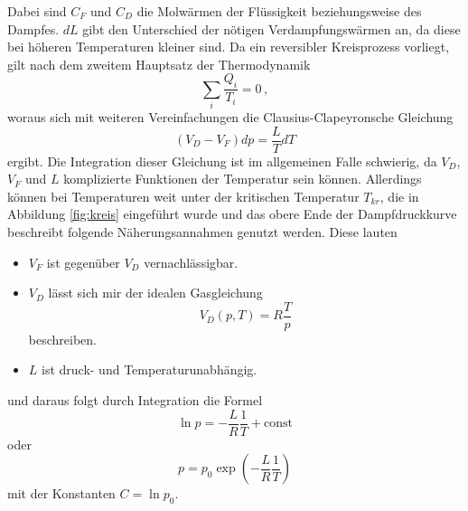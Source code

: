 Dabei sind $C_F$ und $C_D$ die Molwärmen der Flüssigkeit beziehungsweise des Dampfes. 
$dL$ gibt den Unterschied der nötigen Verdampfungswärmen an, da diese bei höheren Temperaturen kleiner sind. Da ein reversibler Kreisprozess vorliegt, gilt nach dem zweitem Hauptsatz
der Thermodynamik 
\begin{equation}
    \sum_i \frac{Q_i}{T_i} = 0 \, ,
\end{equation}
woraus sich mit weiteren Vereinfachungen die Clausius-Clapeyronsche Gleichung
\begin{equation}
    (V_D-V_F)dp = \frac{L}{T}dT
    \label{eqn:claus}
\end{equation}
ergibt. Die Integration dieser Gleichung ist im allgemeinen Falle schwierig, da $V_D$, $V_F$ und $L$ komplizierte Funktionen der Temperatur sein können.
Allerdings können bei Temperaturen weit unter der kritischen Temperatur $T_{kr}$, die in Abbildung \ref{fig:kreis} eingeführt wurde und das obere Ende der Dampfdruckkurve beschreibt
folgende Näherungsannahmen genutzt werden. Diese lauten
\begin{itemize}
    \item $V_F$ ist gegenüber $V_D$ vernachlässigbar.
    \item $V_D$ lässt sich mir der idealen Gasgleichung
        \begin{equation}
            V_D(p,T) =R \frac{T}{p}
            \label{eqn:ideal}
        \end{equation}
        beschreiben.
    \item $L$ ist druck- und Temperaturunabhängig.
\end{itemize}
und daraus folgt durch Integration die Formel
\begin{equation}
    \ln p = - \frac{L}{R} \frac{1}{T} + \text{const}
    \label{eqn:log}
\end{equation}
oder
\begin{equation}
    p= p_0 \exp \left(- \frac{L}{R} \frac{1}{T}\right)
\end{equation}
mit der Konstanten $C= \ln p_0$.